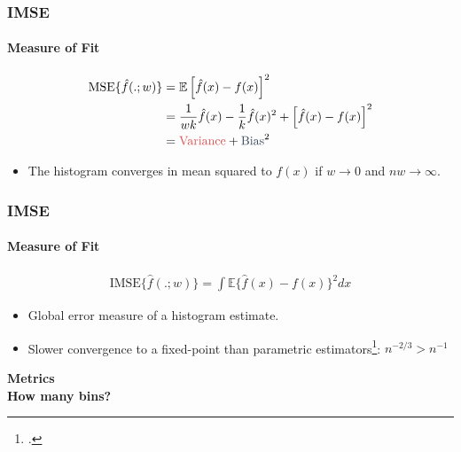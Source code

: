 \documentclass[mathserif]{beamer}
\begin{document}
    \begin{frame}
        \frametitle{IMSE}
        \framesubtitle{Measure of Fit}

        \begin{equation}
            \label{eq:histogram_mse}
            \begin{split}
                \textrm{MSE}\{\hat{f}(.; w)\} & = \mathbb{E}\left[\hat{f}(x)-f(x)\right]^{2} \\
                & = \frac{1}{w k} \hat{f}(x)-\frac{1}{k} \hat{f}(x)^{2}+\left[\hat{f}(x)-f(x)\right]^{2} \\
                & = \text{\textcolor{maraschino}{Variance}} + \text{\textcolor{navydarkblue}{Bias}}^{2}
            \end{split}
        \end{equation}

        \begin{itemize}
            \item The histogram converges in mean squared to $f(x)$ if $w \rightarrow 0$ and $nw \rightarrow \infty$.
        \end{itemize}
    \end{frame}

    \begin{frame}
        \frametitle{IMSE}
        \framesubtitle{Measure of Fit}

        \begin{equation}
            \label{eq:histogram_imse}
            \begin{split}
                \textrm{IMSE}\{\hat{f}(.; w)\} = \int \mathbb{E}\{\hat{f}(x)-f(x)\}^{2} dx
            \end{split}
        \end{equation}

        \begin{itemize}
            \item Global error measure of a histogram estimate.
            \item Slower convergence to a fixed-point than parametric estimators\footcite{Wasserman2004}: $n^{-2/3} > n^{-1}$
        \end{itemize}


    \end{frame}


    \begin{frame}
        \Huge \textbf{Metrics} \\
        \qquad \LARGE \textbf{How many bins?}

    \end{frame}
\end{document}
